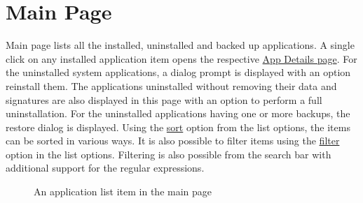 \section{Main Page}\label{sec:main-page} %
Main page lists all the installed, uninstalled and backed up applications. A single click on any
installed application item opens the respective \hyperref[sec:app-details-page]{App Details page}.
For the uninstalled system applications, a dialog prompt is displayed with an option reinstall them.
The applications uninstalled without removing their data and signatures are also displayed in this
page with an option to perform a full uninstallation. For the uninstalled applications having one or
more backups, the restore dialog is displayed. Using the \hyperlink{par:main-page-sort}{sort} option
from the list options, the items can be sorted in various ways. It is also possible to filter items
using the \hyperlink{par:main-page-filter}{filter} option in the list options. Filtering is also
possible from the search bar with additional support for the regular expressions.

\begin{figure}[ht]
    \centering
    
    \caption{An application list item in the main page} %
    \label{fig:main_page_entry_info_labeled}
\end{figure}

